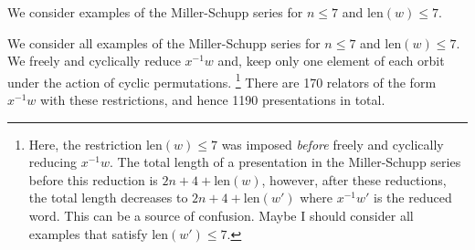 We consider examples of the Miller-Schupp series for $n \leq 7$ and $\text{len}(w) \leq 7$. 
 

We consider all examples of the Miller-Schupp series for $n \leq 7$ and $\text{len}(w) \leq 7$.
We freely and cyclically reduce $x^{-1}w$ and, keep only one element of each orbit under the action of cyclic permutations.
\footnote{Here, the restriction len$(w) \leq 7$ was imposed \textit{before} freely and cyclically reducing $x^{-1}w$.
The total length of a presentation in the Miller-Schupp series before this reduction is $2n+4+\text{len}(w)$, however, after these reductions, the total length decreases to $2n+4+\text{len}(w')$ where $x^{-1}w'$ is the reduced word.
This can be a source of confusion.
Maybe I should consider all examples that satisfy $\text{len}(w') \leq 7$.}
There are 170 relators of the form $x^{-1}w$ with these restrictions, and hence 1190 presentations in total.

